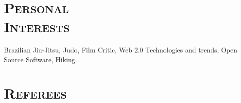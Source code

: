 \begin{resume}


\section{\textsc{Personal\\ Interests}}
\employer{}
\title{}
\location{} 
\dates{}
Brazilian Jiu-Jitsu, Judo, Film Critic, Web 2.0 Technologies and trends, Open Source Software, Hiking.

\section{\textsc{Referees}}


\end{resume}
